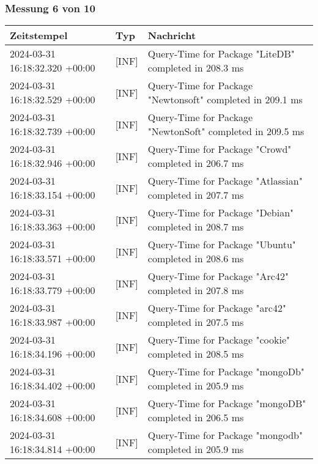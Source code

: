     \subsubsection{Messung 6 von 10} \label{subsubsec:MySQLOhneIndex6von10}
        {
            {\small
                \begin{tabularx}{\textwidth}{|l|l|X|}
                    \hline
                    \textbf{Zeitstempel} & \textbf{Typ} & \textbf{Nachricht} \\
                    \hline
                    \endhead
                    2024-03-31 16:18:32.320 +00:00 & [INF] & Query-Time for Package "LiteDB" completed in 208.3 ms \\
                    2024-03-31 16:18:32.529 +00:00 & [INF] & Query-Time for Package "Newtonsoft" completed in 209.1 ms \\
                    2024-03-31 16:18:32.739 +00:00 & [INF] & Query-Time for Package "NewtonSoft" completed in 209.5 ms \\
                    2024-03-31 16:18:32.946 +00:00 & [INF] & Query-Time for Package "Crowd" completed in 206.7 ms \\
                    2024-03-31 16:18:33.154 +00:00 & [INF] & Query-Time for Package "Atlassian" completed in 207.7 ms \\
                    2024-03-31 16:18:33.363 +00:00 & [INF] & Query-Time for Package "Debian" completed in 208.7 ms \\
                    2024-03-31 16:18:33.571 +00:00 & [INF] & Query-Time for Package "Ubuntu" completed in 208.6 ms \\
                    2024-03-31 16:18:33.779 +00:00 & [INF] & Query-Time for Package "Arc42" completed in 207.8 ms \\
                    2024-03-31 16:18:33.987 +00:00 & [INF] & Query-Time for Package "arc42" completed in 207.5 ms \\
                    2024-03-31 16:18:34.196 +00:00 & [INF] & Query-Time for Package "cookie" completed in 208.5 ms \\
                    2024-03-31 16:18:34.402 +00:00 & [INF] & Query-Time for Package "mongoDb" completed in 205.9 ms \\
                    2024-03-31 16:18:34.608 +00:00 & [INF] & Query-Time for Package "mongoDB" completed in 206.5 ms \\
                    2024-03-31 16:18:34.814 +00:00 & [INF] & Query-Time for Package "mongodb" completed in 205.9 ms \\

\end{tabularx}}}
